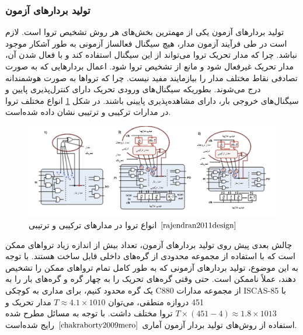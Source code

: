 \subsubsection {تولید بردارهای آزمون}
تولید بردارهای آزمون یکی از مهمترین بخش‌های هر روش تشخیص تروا است. لازم است در طی فرآیند آزمون مدار، هیچ سیگنال فعالساز آزمونی به طور آشکار موجود نباشد. چرا که مدار تحریک تروا می‌تواند از این سیگنال استفاده کند و با فعال شدن آن، مدار تحریک غیرفعال شود و مانع از تشخیص تروا شود. اعمال بردارهایی که به صورت تصادفی نقاط مختلف مدار را بیازمایند مفید نیست. چرا که تروا‌ها به صورت هوشمندانه درج می‌شوند. بطوریکه سیگنال‌های ورودی تحریک دارای کنترل‌پذیری پایین و سیگنال‌های خروجی بار، دارای مشاهده‌پذیری پایینی باشند. در شکل \ref{fig2-4} انواع مختلف تروا در مدارات ترکیبی و ترتیبی نشان داده شده‌است.
\begin{figure}
	\begin{center}
		\includegraphics[scale=.6]{figs/fig2-4.png}
		\caption[انواع تروا در مدارهای ترکیبی و ترتیبی]
		{انواع تروا در مدارهای ترکیبی و ترتیبی $\cite{rajendran2011design}$}
		\label{fig2-4}
	\end{center}
\end{figure}
چالش بعدی پیش روی تولید بردارهای آزمون، تعداد بیش از اندازه زیاد تروا‌های ممکن است که با استفاده از مجموعه محدودی از گره‌های داخلی قابل ساخت هستند. با توجه به این موضوع، تولید بردارهای آزمونی که به طور کامل تمام تروا‌های ممکن را تشخیص دهند، عملاً ناممکن است. حتی وقتی گره‌های تحریک را به چهار گره و گره‌های بار را به یک گره محدود کنیم، برای مداری به کوچکی C880 از مجموعه مدارات ISCAS-85 با 451 دروازه منطقی، می‌توان 
$T\approx 4.1 \times 1010$
 مدار تحریک و 
${T\times (451-4)\approx 1.8\times 1013}$
 تروا مختلف داشت. با توجه به مسائل مطرح شده استفاده از روش‌های تولید بردار آزمون آماری $\cite{chakraborty2009mero}$ رایج شده‌است.

